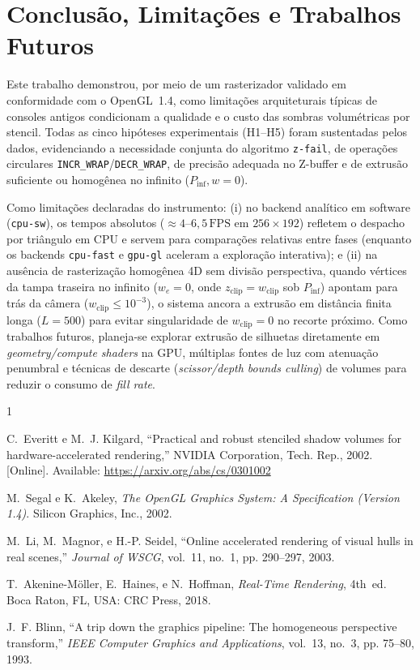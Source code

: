 \documentclass[conference]{IEEEtran}
\begin{document}
\section{Conclusão, Limitações e Trabalhos Futuros}

Este trabalho demonstrou, por meio de um rasterizador validado em conformidade com o OpenGL~1.4, como limitações arquiteturais típicas de consoles antigos condicionam a qualidade e o custo das sombras volumétricas por stencil. Todas as cinco hipóteses experimentais (H1--H5) foram sustentadas pelos dados, evidenciando a necessidade conjunta do algoritmo \texttt{z-fail}, de operações circulares \texttt{INCR\_WRAP}/\texttt{DECR\_WRAP}, de precisão adequada no Z-buffer e de extrusão suficiente ou homogênea no infinito ($P_{\text{inf}}, w=0$).

Como limitações declaradas do instrumento: (i) no backend analítico em software (\texttt{cpu-sw}), os tempos absolutos ($\approx 4$--$6{,}5\,\text{FPS}$ em $256\times 192$) refletem o despacho por triângulo em CPU e servem para comparações relativas entre fases (enquanto os backends \texttt{cpu-fast} e \texttt{gpu-gl} aceleram a exploração interativa); e (ii) na ausência de rasterização homogênea 4D sem divisão perspectiva, quando vértices da tampa traseira no infinito ($w_e=0$, onde $z_{\text{clip}}=w_{\text{clip}}$ sob $P_{\text{inf}}$) apontam para trás da câmera ($w_{\text{clip}} \le 10^{-3}$), o sistema ancora a extrusão em distância finita longa ($L=500$) para evitar singularidade de $w_{\text{clip}}=0$ no recorte próximo. Como trabalhos futuros, planeja-se explorar extrusão de silhuetas diretamente em \textit{geometry/compute shaders} na GPU, múltiplas fontes de luz com atenuação penumbral e técnicas de descarte (\textit{scissor/depth bounds culling}) de volumes para reduzir o consumo de \textit{fill rate}.

\begin{thebibliography}{1}

C.~Everitt e M.~J. Kilgard, ``Practical and robust stenciled shadow volumes for hardware-accelerated rendering,'' NVIDIA Corporation, Tech. Rep., 2002. [Online]. Available: \url{https://arxiv.org/abs/cs/0301002}

M.~Segal e K.~Akeley, \emph{The OpenGL Graphics System: A Specification (Version 1.4)}. Silicon Graphics, Inc., 2002.

M.~Li, M.~Magnor, e H.-P. Seidel, ``Online accelerated rendering of visual hulls in real scenes,'' \emph{Journal of WSCG}, vol.~11, no.~1, pp. 290--297, 2003.

T.~Akenine-Möller, E.~Haines, e N.~Hoffman, \emph{Real-Time Rendering}, 4th~ed. Boca Raton, FL, USA: CRC Press, 2018.

J.~F. Blinn, ``A trip down the graphics pipeline: The homogeneous perspective transform,'' \emph{IEEE Computer Graphics and Applications}, vol.~13, no.~3, pp. 75--80, 1993.

\end{thebibliography}
\end{document}
